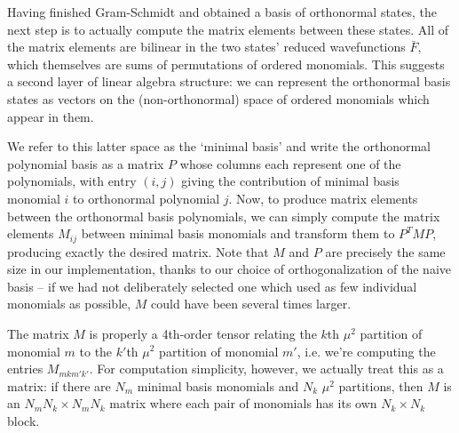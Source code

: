 \begin{subappendices}
Having finished Gram-Schmidt and obtained a basis of orthonormal states, the
next step is to actually compute the matrix elements between these states. All
of the matrix elements are bilinear in the two states' reduced wavefunctions
$\bar F$, which themselves are sums of permutations of ordered monomials. This
suggests a second layer of linear algebra structure: we can represent the 
orthonormal basis states as vectors on the (non-orthonormal) space of ordered
monomials which appear in them. 

We refer to this latter space as the `minimal basis' and write the orthonormal 
polynomial basis as a matrix $P$ whose columns each represent one of the 
polynomials, with entry $(i,j)$ giving the contribution of minimal basis 
monomial $i$ to orthonormal polynomial $j$. Now, to produce matrix elements 
between the orthonormal basis polynomials, we can simply compute the matrix 
elements $M_{ij}$ between minimal basis monomials and transform them to 
$P^T M P$, producing exactly the desired matrix. Note that $M$ and $P$ are
precisely the same size in our implementation, thanks to our choice of
orthogonalization of the naive basis -- if we had not deliberately selected one 
which used as few individual monomials as possible, $M$ could have been several 
times larger.

The matrix $M$ is properly a 4th-order tensor relating the $k$th $\mu^2$ 
partition of monomial $m$ to the $k'$th $\mu^2$ partition of monomial $m'$, i.e.
we're computing the entries $M_{mkm'k'}$. For computation simplicity, however,
we actually treat this as a matrix: if there are $N_m$ minimal basis monomials
and $N_k$ $\mu^2$ partitions, then $M$ is an $N_m N_k \times N_m N_k$ matrix
where each pair of monomials has its own $N_k \times N_k$ block. 


\end{subappendices}
